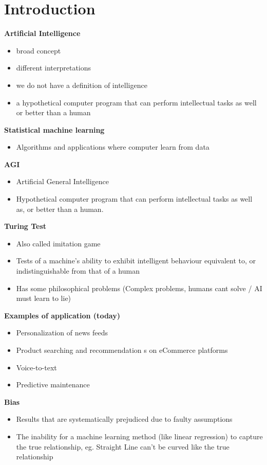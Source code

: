 
\section{Introduction}
\textbf{Artificial Intelligence}
\begin{itemize}
    \item broad concept
    \item different interpretations
    \item we do not have a definition of intelligence
    \item a hypothetical computer program that can perform intellectual tasks as well or better than a human
\end{itemize}
\textbf{Statistical machine learning}
\begin{itemize}
    \item Algorithms and applications where computer learn from data
\end{itemize}
\textbf{AGI}
\begin{itemize}
    \item Artificial General Intelligence
    \item Hypothetical computer program that can perform intellectual tasks as well as, or better than a human.
\end{itemize}
\textbf{Turing Test}
\begin{itemize}
    \item Also called imitation game
    \item Tests of a machine's ability to exhibit intelligent behaviour equivalent to, or indistinguishable from that of a human
    \item Has some philosophical problems (Complex problems, humans cant solve / AI must learn to lie)
\end{itemize}
\textbf{Examples of application (today)}
\begin{itemize}
    \item Personalization of news feeds
    \item Product searching and recommendation s on eCommerce platforms
    \item Voice-to-text
    \item Predictive maintenance
\end{itemize}
\textbf{Bias}
\begin{itemize}
    \item Results that are systematically prejudiced due to faulty assumptions
    \item The inability for a machine learning method (like linear regression) to capture the true relationship, eg. Straight Line can't be curved like the true relationship
\end{itemize}
